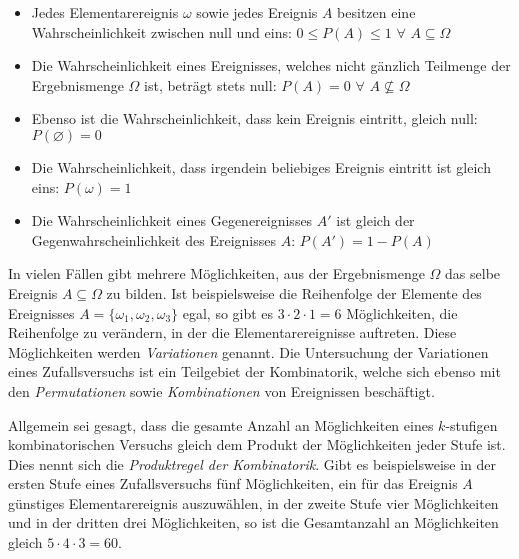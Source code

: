 \begin{itemize}
	\item Jedes Elementarereignis $\omega$ sowie jedes Ereignis $A$ besitzen eine Wahrscheinlichkeit zwischen null und eins: $0 \leq P(A) \leq 1 \,\,\forall\,\, A \subseteq \Omega$

	\item Die Wahrscheinlichkeit eines Ereignisses, welches nicht g\"{a}nzlich Teilmenge der Ergebnismenge $\Omega$ ist, betr\"{a}gt stets null: $P(A) = 0 \,\,\forall\,\, A \nsubseteq \Omega$

	\item Ebenso ist die Wahrscheinlichkeit, dass kein Ereignis eintritt, gleich null: $P(\varnothing) = 0$

	\item Die Wahrscheinlichkeit, dass irgendein beliebiges Ereignis eintritt ist gleich eins: $P(\omega) = 1$

	\item Die Wahrscheinlichkeit eines Gegenereignisses $A'$ ist gleich der Gegenwahrscheinlichkeit des Ereignisses $A$: $P(A') = 1 - P(A)$
\end{itemize}


In vielen F\"{a}llen gibt mehrere M\"{o}glichkeiten, aus der Ergebnismenge $\Omega$ das selbe Ereignis $A \subseteq \Omega$ zu bilden. Ist beispielsweise die Reihenfolge der Elemente des Ereignisses $A = \{\omega_1, \omega_2, \omega_3\}$ egal, so gibt es $3 \cdot 2 \cdot 1 = 6$ M\"{o}glichkeiten, die Reihenfolge zu ver\"{a}ndern, in der die Elementarereignisse auftreten. Diese M\"{o}glichkeiten werden \emph{Variationen} genannt. Die Untersuchung der Variationen eines Zufallsversuchs ist ein Teilgebiet der Kombinatorik, welche sich ebenso mit den \emph{Permutationen} sowie \emph{Kombinationen} von Ereignissen besch\"{a}ftigt.

Allgemein sei gesagt, dass die gesamte Anzahl an M\"{o}glichkeiten eines $k$-stufigen kombinatorischen Versuchs gleich dem Produkt der M\"{o}glichkeiten jeder Stufe ist. Dies nennt sich die \emph{Produktregel der Kombinatorik}. Gibt es beispielsweise in der ersten Stufe eines Zufallsversuchs f\"{u}nf M\"{o}glichkeiten, ein f\"{u}r das Ereignis $A$ g\"{u}nstiges Elementarereignis auszuw\"{a}hlen, in der zweite Stufe vier M\"{o}glichkeiten und in der dritten drei M\"{o}glichkeiten, so ist die Gesamtanzahl an M\"{o}glichkeiten gleich $5 \cdot 4 \cdot 3 = 60$.


